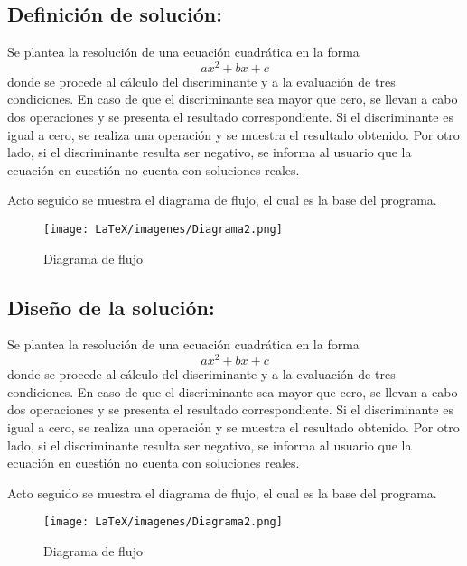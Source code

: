 \subsection{\textbf{Definición de solución:}}
Se plantea la resolución de una ecuación cuadrática en la forma 
\begin{equation}
ax^{2}+bx+c
\end{equation}
donde se procede al cálculo del discriminante y a la evaluación de tres condiciones. En caso de que el discriminante sea mayor que cero, se llevan a cabo dos operaciones y se presenta el resultado correspondiente. Si el discriminante es igual a cero, se realiza una operación y se muestra el resultado obtenido. Por otro lado, si el discriminante resulta ser negativo, se informa al usuario que la ecuación en cuestión no cuenta con soluciones reales.

Acto seguido se muestra el diagrama de flujo, el cual es la base del programa.

\begin{figure}[H]
    \centering
    \texttt{[image: LaTeX/imagenes/Diagrama2.png]}
    \caption{Diagrama de flujo}
    \label{fig:diagrama de flujo}
\end{figure}


\subsection{\textbf{Diseño de la solución:}}
Se plantea la resolución de una ecuación cuadrática en la forma 
\begin{equation}
ax^{2}+bx+c
\end{equation}
donde se procede al cálculo del discriminante y a la evaluación de tres condiciones. En caso de que el discriminante sea mayor que cero, se llevan a cabo dos operaciones y se presenta el resultado correspondiente. Si el discriminante es igual a cero, se realiza una operación y se muestra el resultado obtenido. Por otro lado, si el discriminante resulta ser negativo, se informa al usuario que la ecuación en cuestión no cuenta con soluciones reales.

Acto seguido se muestra el diagrama de flujo, el cual es la base del programa.

\begin{figure}[H]
    \centering
    \texttt{[image: LaTeX/imagenes/Diagrama2.png]}
    \caption{Diagrama de flujo}
    \label{fig:diagrama de flujo}
\end{figure}


